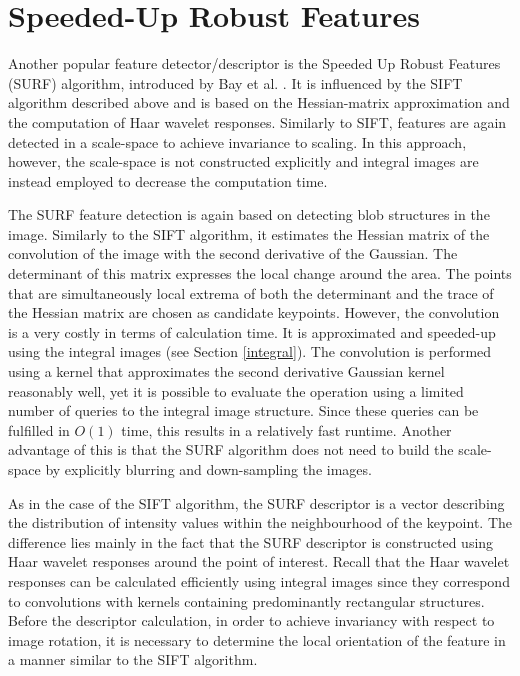 \section{Speeded-Up Robust Features}

Another popular feature detector/descriptor is the Speeded Up Robust Features (SURF) algorithm, introduced by Bay et al. \cite{surf2006}. 
It is influenced by the SIFT algorithm described above and is based on the Hessian-matrix approximation and the computation of Haar wavelet responses. 
Similarly to SIFT, features are again detected in a scale-space to achieve invariance to scaling.
In this approach, however, the scale-space is not constructed explicitly and integral images are instead employed to decrease the computation time. 

The SURF feature detection is again based on detecting blob structures in the image. 
Similarly to the SIFT algorithm, it estimates the Hessian matrix of the convolution of the image with the second derivative of the Gaussian.
The determinant of this matrix expresses the local change around the area.
The points that are simultaneously local extrema of both the determinant and the trace of the Hessian matrix are chosen as candidate keypoints.
However, the convolution is a very costly in terms of calculation time.
It is approximated and speeded-up using the integral images (see Section \ref{integral}).
The convolution is performed using a kernel that approximates the second derivative Gaussian kernel reasonably well, yet it is possible to evaluate the operation using a limited number of queries to the integral image structure. 
Since these queries can be fulfilled in $O(1)$ time, this results in a relatively fast runtime. 
Another advantage of this is that the SURF algorithm does not need to build the scale-space by explicitly blurring and down-sampling the images.

As in the case of the SIFT algorithm, the SURF descriptor is a vector describing the distribution of intensity values within the neighbourhood of the keypoint. 
The difference lies mainly in the fact that the SURF descriptor is constructed using Haar wavelet responses around the point of interest. 
Recall that the Haar wavelet responses can be calculated efficiently using integral images since they correspond to convolutions with kernels containing predominantly rectangular structures. 
Before the descriptor calculation, in order to achieve invariancy with respect to image rotation, it is necessary to determine the local orientation of the feature in a manner similar to the SIFT algorithm. 

